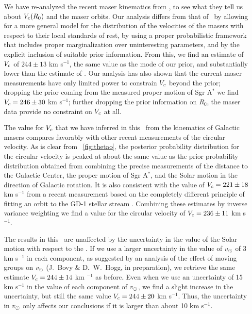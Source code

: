 We have re-analyzed the recent maser kinematics from \reid, to see
what they tell us about $V_c(R_0)$ and the maser orbits. Our analysis
differs from that of \reid\ by allowing for a more general model for
the distribution of the velocities of the masers with respect to their
local standards of rest, by using a proper probabilistic framework
that includes proper marginalization over uninteresting parameters,
and by the explicit inclusion of suitable prior information. From
this, we find an estimate of $V_c$ of $244 \pm 13$ km s$^{-1}$, the
same value as the mode of our prior, and substantially lower than the
estimate of \reid. Our analysis has also shown that the current maser
measurements have only limited power to constrain $V_c$ beyond the
prior; dropping the prior coming from the measured proper motion of
Sgr A$^*$ we find $V_c = 246 \pm 30$ km s$^{-1}$; further dropping the
prior information on $R_0$, the maser data provide no constraint on
$V_c$ at all.

The value for $V_c$ that we have inferred in this \chaptername\ from
the kinematics of Galactic masers compares favorably with other recent
measurements of the circular velocity. As is clear from
\figurename~\ref{fig:thetao}, the posterior probability distribution
for the circular velocity is peaked at about the same value as the
prior probability distribution obtained from combining the precise
measurements of the distance to the Galactic Center, the proper motion
of Sgr A$^*$, and the Solar motion in the direction of Galactic
rotation. It is also consistent with the value of $V_c = 221 \pm 18$
km s$^{-1}$ from a recent measurement based on the completely
different principle of fitting an orbit to the GD-1 stellar stream
\citep{Koposov09a}. Combining these estimates by inverse variance
weighting we find a value for the circular velocity of $V_c = 236 \pm
11$ km s$^{-1}$.

The results in this \chaptername\ are unaffected by the uncertainty in
the value of the Solar motion with respect to the \lsr. If we use a
larger uncertainty in the value of $v_\odot$ of 3 km s$^{-1}$ in each
component, as suggested by an analysis of the effect of moving groups
on $v_\odot$ (J.~Bovy \& D.~W.~Hogg, in preparation), we retrieve the
same estimate $V_c = 244 \pm 14$ km $^{-1}$ as before. Even when we
use an uncertainty of 15 km s$^{-1}$ in the value of each component of
$v_\odot$, we find a slight increase in the uncertainty, but still
the same value $V_c = 244 \pm 20$ km s$^{-1}$. Thus, the uncertainty
in $v_\odot$ only affects our conclusions if it is larger than about
10 km s$^{-1}$.

